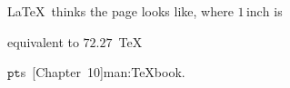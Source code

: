 \documentclass{bhamthesis}
\makeatletter
\renewcommand{\cite}{\@ifstar{\@ifstar{\HAR@acite}{\HAR@fcite}}{\HAR@acite}}
\newcommand{\inch}{\mathrm{inch}}
\newcommand{\pt}{\mathtt{pt}}
\newcommand{\pkg}[1]{\textsf{#1}}
\makeatother
\begin{document}
\begin{itemize}
  \LaTeX\ thinks the page looks like, where $1\,\inch$ is

  equivalent to $72.27$~\TeX\

  $\pt$s~\cite[Chapter~10]{man:TeXbook}. %
















\end{itemize}
\end{document}
